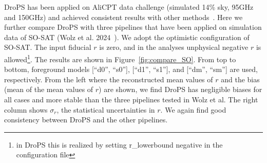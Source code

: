 \documentclass[12pt, a4paper]{ctexart} %
\begin{document}
DroPS has been applied on AliCPT data challenge (simulated 14\% sky, 95GHz and 150GHz) and achieved consistent results with other methods~\cite{Zhang24}. Here we further compare DroPS with three pipelines that have been applied on simulation data of SO-SAT (Wolz et al. 2024~\cite{SO-SAT}). We adopt the optimistic configuration of SO-SAT. The input fiducial $r$ is zero, and in the analyses unphysical negative $r$ is allowed\footnote{in DroPS this is realized by setting r\_lowerbound negative in the configuration file}.  The results are shown in Figure~\ref{fig:compare_SO}.  From top to bottom, foreground models [``d0'', ``s0''], [``d1'', ``s1''], and [``dm'', ``sm''] are used, respectively. From the left where the reconstructed mean values of $r$ and the bias (mean of the mean values of $r$) are shown, we find DroPS has negligible biases for all cases and more stable than the three pipelines tested in Wolz et al. The right column shows $\sigma_r$, the statistical uncertainties in $r$. We again find good consistency between DroPS and the other pipelines. 
\end{document}
